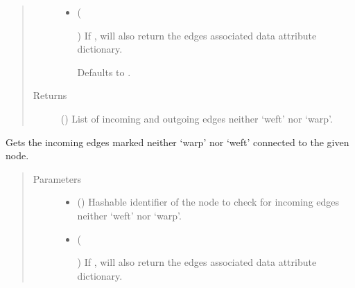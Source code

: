 \documentclass[letterpaper,10pt,english]{sphinxmanual}
\begin{document}
\begin{fulllineitems}
\begin{fulllineitems}
\begin{quote}
\begin{description}
\begin{itemize}
\item {} 
 (%
\begin{footnote}[146]\sphinxAtStartFootnote
{}
%
\end{footnote}\sphinxstyleliteralemphasis{\sphinxupquote{, }}) \textendash{} 
If , will also return the edges associated data attribute
dictionary.

Defaults to .


\end{itemize}

\item[{Returns}] \leavevmode
{} () \textendash{} List of incoming and outgoing edges neither ‘weft’ nor ‘warp’.

\end{description}\end{quote}

\end{fulllineitems}


\begin{fulllineitems}
\label{\detokenize{cockatoo:cockatoo.KnitDiNetwork.node_contour_edges_in}}
Gets the incoming edges marked neither ‘warp’ nor ‘weft’ connected to
the given node.
\begin{quote}\begin{description}
\item[{Parameters}] \leavevmode\begin{itemize}
\item {} 
 () \textendash{} Hashable identifier of the node to check for incoming edges neither
‘weft’ nor ‘warp’.

\item {} 
 (%
\begin{footnote}[147]\sphinxAtStartFootnote
{}
%
\end{footnote}\sphinxstyleliteralemphasis{\sphinxupquote{, }}) \textendash{} 
If , will also return the edges associated data attribute
dictionary.


\end{itemize}
\end{description}
\end{quote}
\end{fulllineitems}
\end{fulllineitems}
\end{document}
